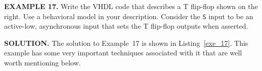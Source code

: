 \begin{leftbar}
\begin{minipage}{0.5\linewidth}
\noindent
\textbf{EXAMPLE 17.}
Write the VHDL code that describes a T flip-flop shown on the right. Use a behavioral model in your description. Consider the \texttt{S} input to be an active-low, asynchronous input that sets the T flip-flop outputs when asserted.
\end{minipage}
\begin{minipage}{0.47\linewidth}
\begin{flushright}
\end{flushright}
\end{minipage}
\end{leftbar}
\noindent
\textbf{SOLUTION.} The solution to Example~17 is shown in Listing~\ref{exe_17}. This example has some very important techniques associated with it that are well worth mentioning below.
